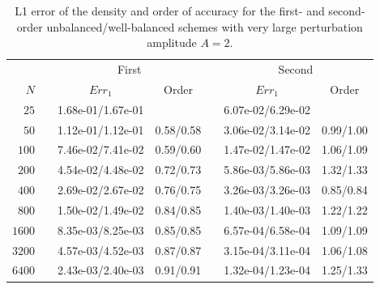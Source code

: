 \begin{table}\centering
\caption{L1 error of the density and order of accuracy for the first- and second-order unbalanced/well-balanced schemes with very large perturbation amplitude $A=2$.}
\label{table:OVS_Alarge}
\begin{tabular}{@{}rcccccc@{}}\toprule
& \phantom{a} & \multicolumn{2}{c}{First} & \phantom{ab} & \multicolumn{2}{c}{Second}\\
\cmidrule{3-4} \cmidrule{6-7}
$N$ && $Err_1$ & Order && $Err_1$ & Order\\ \midrule
$25$ && 1.68e-01/1.67e-01 &&& 6.07e-02/6.29e-02 &\\
$50$ && 1.12e-01/1.12e-01 & 0.58/0.58 && 3.06e-02/3.14e-02 & 0.99/1.00\\
$100$ && 7.46e-02/7.41e-02 & 0.59/0.60 && 1.47e-02/1.47e-02 & 1.06/1.09\\
$200$ && 4.54e-02/4.48e-02 & 0.72/0.73 && 5.86e-03/5.86e-03 & 1.32/1.33\\
$400$ && 2.69e-02/2.67e-02 & 0.76/0.75 && 3.26e-03/3.26e-03 & 0.85/0.84\\
$800$ && 1.50e-02/1.49e-02 & 0.84/0.85 && 1.40e-03/1.40e-03 & 1.22/1.22\\
$1600$ && 8.35e-03/8.25e-03 & 0.85/0.85 && 6.57e-04/6.58e-04 & 1.09/1.09\\
$3200$ && 4.57e-03/4.52e-03 & 0.87/0.87 && 3.15e-04/3.11e-04 & 1.06/1.08\\
$6400$ && 2.43e-03/2.40e-03 & 0.91/0.91 && 1.32e-04/1.23e-04 & 1.25/1.33\\
\bottomrule
\end{tabular}
\end{table}

